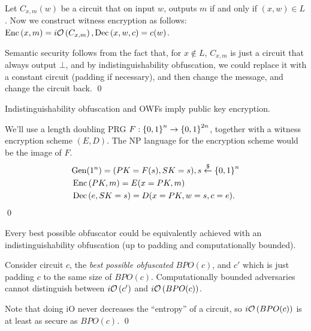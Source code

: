 Let $C_{x,m}(w)$ be a circuit that on input $w$, outputs $m$ if and only if $(x,w) \in L$.
Now we construct witness encryption as follows:
$\mathop{\mathrm{Enc}}\left(x,m\right)=\mathop{i\mathcal{O}}\left(C_{x,m}\right), \mathop{\mathrm{Dec}}\left(x,w,c\right)=c(w)$.

Semantic security follows from the fact that, for $x\not\in L$, $C_{x,m}$ is just a circuit that always output $\bot$, and by indistinguishability obfuscation, we could replace it with a constant circuit (padding if necessary), and then change the message, and change the circuit back.
\qed


\begin{proposition}
	Indistinguishability obfuscation and OWFs imply public key encryption.
\end{proposition}
\proof
We'll use a length doubling PRG $F: \left\{0,1\right\}^n \to \left\{0,1\right\}^{2n}$, together with a witness encryption scheme $(E,D)$.
The NP language for the encryption scheme would be the image of $F$.
\begin{align*}
	&\mathrm{Gen}(1^n) = (PK = F(s), SK=s), s\overset{\$}{\leftarrow} \left\{0,1\right\}^n\\
	&\mathop{\mathrm{Enc}}\left(PK,m\right) = E(x=PK,m)\\
	&\mathop{\mathrm{Dec}}\left(e,SK=s\right) = D(x=PK,w=s,c=e).
\end{align*}
\qed

\begin{proposition}
	Every best possible obfuscator could be equivalently achieved with an indistinguishability obfuscation (up to padding and computationally bounded).
\end{proposition}

\proof
Consider circuit $c$, the \emph{best possible obfuscated} $BPO(c)$, and $c'$ which is just padding $c$ to the same size of $BPO(c)$.
Computationally bounded adversaries cannot distinguish between $\mathop{i\mathcal{O}}\left(c'\right)$ and $\mathop{i\mathcal{O}}\left(BPO(c)\right)$.

Note that doing iO never decreases the ``entropy'' of a circuit, so $\mathop{i\mathcal{O}}\left(BPO(c)\right)$ is at least as secure as $BPO(c)$.
\qed



